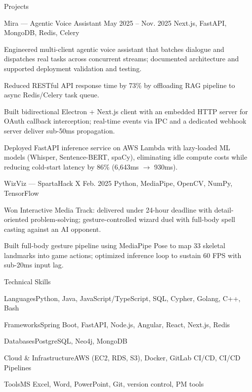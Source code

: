 \documentclass[
	11pt
]{../../../resume}
\begin{document}
	\begin{rSection}{P}{rojects}
		\begin{rSectionEntry}
			{Mira --- Agentic Voice Assistant}
			{May 2025 -- Nov. 2025}
			{}
			{Next.js, FastAPI, MongoDB, Redis, Celery}
			{}

			\item Engineered multi-client agentic voice assistant that batches dialogue and dispatches real tasks across concurrent streams; documented architecture and supported deployment validation and testing.
			\item Reduced RESTful API response time by 73\% by offloading RAG pipeline to async Redis/Celery task queue.
			\item Built bidirectional Electron + Next.js client with an embedded HTTP server for OAuth callback interception; real-time events via IPC and a dedicated webhook server deliver sub-50ms propagation.
			\item Deployed FastAPI inference service on AWS Lambda with lazy-loaded ML models (Whisper, Sentence-BERT, spaCy), eliminating idle compute costs while reducing cold-start latency by 86\% (6{,}643ms $\rightarrow$ 930ms).
		\end{rSectionEntry}

		\begin{rSectionEntry}
			{WizViz --- SpartaHack X}
			{Feb. 2025}
			{}
			{Python, MediaPipe, OpenCV, NumPy, TensorFlow}
			{}

			\item Won Interactive Media Track: delivered under 24-hour deadline with detail-oriented problem-solving; gesture-controlled wizard duel with full-body spell casting against an AI opponent.
			\item Built full-body gesture pipeline using MediaPipe Pose to map 33 skeletal landmarks into game actions; optimized inference loop to sustain 60 FPS with sub-20ms input lag.
		\end{rSectionEntry}
	\end{rSection}

	\begin{rSection}{T}{echnical Skills}
		\begin{rSet}{Languages}{Python, Java, JavaScript/TypeScript, SQL, Cypher, Golang, C++, Bash}
		\end{rSet}
		\begin{rSet}{Frameworks}{Spring Boot, FastAPI, Node.js, Angular, React, Next.js, Redis}
		\end{rSet}
		\begin{rSet}{Databases}{PostgreSQL, Neo4j, MongoDB}
		\end{rSet}
		\begin{rSet}{Cloud \& Infrastructure}{AWS (EC2, RDS, S3), Docker, GitLab CI/CD, CI/CD Pipelines}
		\end{rSet}
		\begin{rSet}{Tools}{MS Excel, Word, PowerPoint, Git, version control, PM tools}
		\end{rSet}
	\end{rSection}
\end{document}
